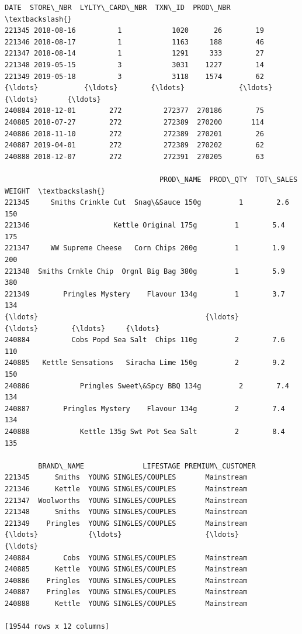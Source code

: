\documentclass[11pt]{article}
\makeatletter
\newcommand{\boxspacing}{\kern\kvtcb@left@rule\kern\kvtcb@boxsep}
\newcommand{\prompt}[4]{
        {\ttfamily\llap{{\color{#2}[#3]:\hspace{3pt}#4}}\vspace{-\baselineskip}}
    }
\makeatother
\begin{document}
            \begin{tcolorbox}[breakable, size=fbox, boxrule=.5pt, pad at break*=1mm, opacityfill=0]
\prompt{Out}{outcolor}{340}{\boxspacing}
\begin{Verbatim}[commandchars=\\\{\}]
             DATE  STORE\_NBR  LYLTY\_CARD\_NBR  TXN\_ID  PROD\_NBR  \textbackslash{}
221345 2018-08-16          1            1020      26        19
221346 2018-08-17          1            1163     188        46
221347 2018-08-14          1            1291     333        27
221348 2019-05-15          3            3031    1227        14
221349 2019-05-18          3            3118    1574        62
{\ldots}           {\ldots}        {\ldots}             {\ldots}     {\ldots}       {\ldots}
240884 2018-12-01        272          272377  270186        75
240885 2018-07-27        272          272389  270200       114
240886 2018-11-10        272          272389  270201        26
240887 2019-04-01        272          272389  270202        62
240888 2018-12-07        272          272391  270205        63

                                     PROD\_NAME  PROD\_QTY  TOT\_SALES  WEIGHT  \textbackslash{}
221345     Smiths Crinkle Cut  Snag\&Sauce 150g         1        2.6     150
221346                    Kettle Original 175g         1        5.4     175
221347     WW Supreme Cheese   Corn Chips 200g         1        1.9     200
221348  Smiths Crnkle Chip  Orgnl Big Bag 380g         1        5.9     380
221349        Pringles Mystery    Flavour 134g         1        3.7     134
{\ldots}                                        {\ldots}       {\ldots}        {\ldots}     {\ldots}
240884          Cobs Popd Sea Salt  Chips 110g         2        7.6     110
240885   Kettle Sensations   Siracha Lime 150g         2        9.2     150
240886            Pringles Sweet\&Spcy BBQ 134g         2        7.4     134
240887        Pringles Mystery    Flavour 134g         2        7.4     134
240888            Kettle 135g Swt Pot Sea Salt         2        8.4     135

        BRAND\_NAME              LIFESTAGE PREMIUM\_CUSTOMER
221345      Smiths  YOUNG SINGLES/COUPLES       Mainstream
221346      Kettle  YOUNG SINGLES/COUPLES       Mainstream
221347  Woolworths  YOUNG SINGLES/COUPLES       Mainstream
221348      Smiths  YOUNG SINGLES/COUPLES       Mainstream
221349    Pringles  YOUNG SINGLES/COUPLES       Mainstream
{\ldots}            {\ldots}                    {\ldots}              {\ldots}
240884        Cobs  YOUNG SINGLES/COUPLES       Mainstream
240885      Kettle  YOUNG SINGLES/COUPLES       Mainstream
240886    Pringles  YOUNG SINGLES/COUPLES       Mainstream
240887    Pringles  YOUNG SINGLES/COUPLES       Mainstream
240888      Kettle  YOUNG SINGLES/COUPLES       Mainstream

[19544 rows x 12 columns]
\end{Verbatim}
\end{tcolorbox}
        
\end{document}
